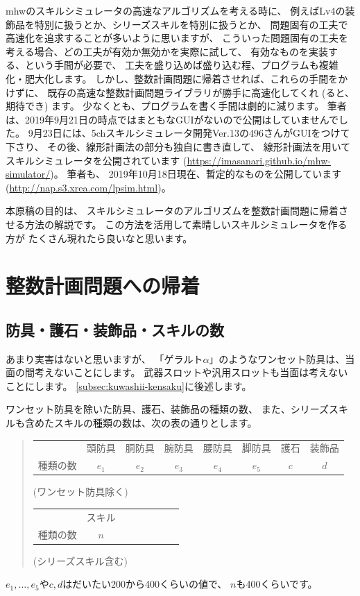 \documentclass{jsarticle}
\begin{document}
mhwのスキルシミュレータの高速なアルゴリズムを考える時に、
例えばLv4の装飾品を特別に扱うとか、シリーズスキルを特別に扱うとか、
問題固有の工夫で高速化を追求することが多いように思いますが、
こういった問題固有の工夫を考える場合、どの工夫が有効か無効かを実際に試して、
有効なものを実装する、という手間が必要で、
工夫を盛り込めば盛り込む程、プログラムも複雑化・肥大化します。
%
しかし、整数計画問題に帰着させれば、これらの手間をかけずに、
既存の高速な整数計画問題ライブラリが勝手に高速化してくれ
(ると、期待でき) ます。
少なくとも、プログラムを書く手間は劇的に減ります。
%
筆者は、2019年9月21日の時点ではまともなGUIがないので公開はしていませんでした。
9月23日には、5chスキルシミュレータ開発Ver.13の496さんがGUIをつけて下さり、
その後、線形計画法の部分も独自に書き直して、
線形計画法を用いてスキルシミュレータを公開されています
(\url{https://imasanari.github.io/mhw-simulator/})。
筆者も、
2019年10月18日現在、暫定的なものを公開しています
(\url{http://nap.s3.xrea.com/lpsim.html})。

本原稿の目的は、
スキルシミュレータのアルゴリズムを整数計画問題に帰着させる方法の解説です。
この方法を活用して素晴しいスキルシミュレータを作る方が
たくさん現れたら良いなと思います。

\section{整数計画問題への帰着}
\subsection{防具・護石・装飾品・スキルの数}
あまり実害はないと思いますが、
「ゲラルト$\alpha$」のようなワンセット防具は、当面の間考えないことにします。
武器スロットや汎用スロットも当面は考えないことにします。
\ref{subsec:kuwashii-kensaku}に後述します。

ワンセット防具を除いた防具、護石、装飾品の種類の数、
また、シリーズスキルも含めたスキルの種類の数は、次の表の通りとします。
\begin{quote}
\begin{tabular}{lccccccc}
\toprule
{}        & 頭防具 & 胴防具 & 腕防具 & 腰防具 & 脚防具 & 護石 & 装飾品 \\
種類の数  & $e_1$ & $e_2$ & $e_3$ & $e_4$ & $e_5$ &  $c$ & $d$  
\\ \bottomrule
\end{tabular}
\quad (ワンセット防具除く)
\bigskip
\\
\begin{tabular}{lccccccc}
\toprule
{}        & スキル\\
種類の数  & $n$
\\ \bottomrule
\end{tabular}
\quad (シリーズスキル含む)
\end{quote}
%
$e_1, \ldots, e_5$や$c, d$はだいたい200から400くらいの値で、
$n$も400くらいです。
\end{document}

